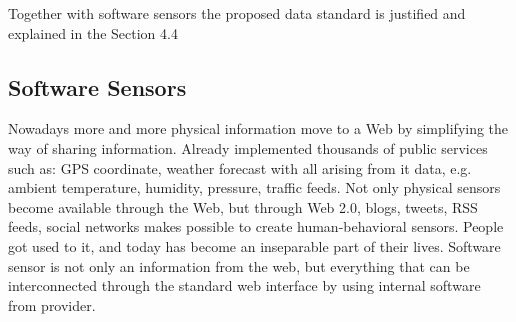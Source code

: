     Together with software sensors the proposed data standard is justified and explained in the Section 4.4

	\subsection {Software Sensors}
	Nowadays more and more physical information move to a Web by simplifying the way of sharing information. Already implemented thousands of public services such as: GPS coordinate, weather forecast with all arising from it data, e.g. ambient temperature, humidity, pressure, traffic feeds. Not only physical sensors become available through the Web, but through Web 2.0, blogs, tweets, RSS feeds, social networks makes possible to create human-behavioral sensors. People got used to it, and today has become an inseparable part of their lives. Software sensor is not only an information from the web, but everything that can be interconnected through the standard web interface by using internal software from provider.
	
